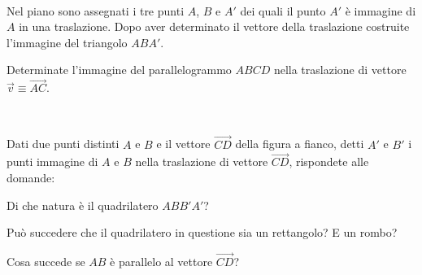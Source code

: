 \begin{esercizio}
\label{ese:}
~

\noindent\begin{minipage}{.70\textwidth}
Nel piano sono assegnati i tre punti $A$, $B$ e $A'$ dei quali il 
punto $A'$ è immagine di $A$ in una traslazione. Dopo aver 
determinato il vettore della traslazione costruite l'immagine del 
triangolo $ABA'$.
\end{minipage} 
\begin{minipage}{.25\textwidth}
\begin{inaccessibleblock}
\begin{center}  \end{center}
\end{inaccessibleblock}
\end{minipage}
\end{esercizio}

\begin{esercizio}
\label{ese:8.45} %
Determinate l'immagine del parallelogrammo $ABCD$ nella traslazione 
di vettore $\vec{v} \equiv \overrightarrow{AC}$.
\end{esercizio}

\begin{esercizio}
\label{ese:}
~

\noindent\begin{minipage}{.70\textwidth}
Dati due punti distinti $A$ e $B$ e il vettore $\overrightarrow{CD}$ 
della figura a fianco, detti $A'$ e $B'$ i punti immagine di $A$ e 
$B$ nella traslazione di vettore $\overrightarrow{CD}$, rispondete 
alle domande:
\begin{enumeratea}
\item Di che natura è il quadrilatero $ABB'A'$?
\item Può succedere che il quadrilatero in questione sia un 
rettangolo? E un rombo?
\item Cosa succede se $AB$ è parallelo al vettore 
$\overrightarrow{CD}$?
\end{enumeratea}
\end{minipage} 
\begin{minipage}{.28\textwidth}
\begin{inaccessibleblock}
\begin{center}  \end{center}
\end{inaccessibleblock}
\end{minipage}
\end{esercizio}

